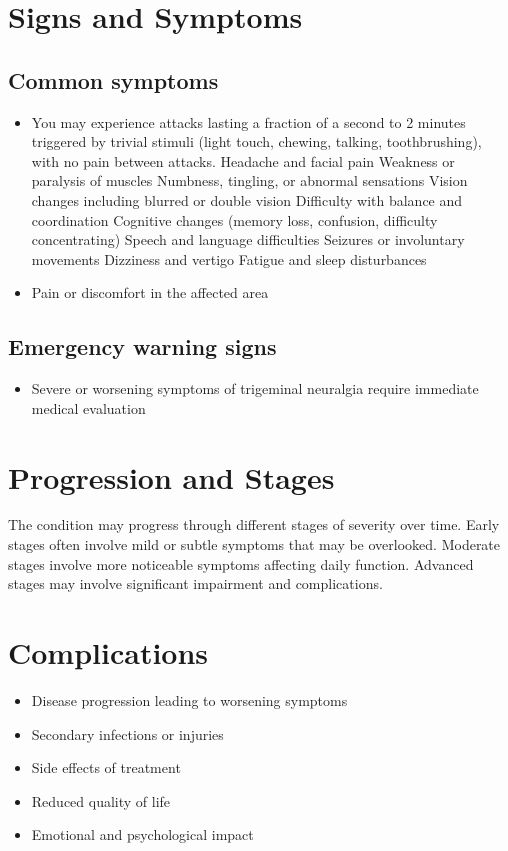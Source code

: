 \section{Signs and Symptoms}

\subsection{Common symptoms}
\begin{itemize}[noitemsep]
  \item You may experience attacks lasting a fraction of a second to 2 minutes triggered by trivial stimuli (light touch, chewing, talking, toothbrushing), with no pain between attacks. Headache and facial pain Weakness or paralysis of muscles Numbness, tingling, or abnormal sensations Vision changes including blurred or double vision Difficulty with balance and coordination Cognitive changes (memory loss, confusion, difficulty concentrating) Speech and language difficulties Seizures or involuntary movements Dizziness and vertigo Fatigue and sleep disturbances

  \item Pain or discomfort in the affected area
  \end{itemize}

\subsection{Emergency warning signs}
\begin{itemize}[noitemsep]
  \item Severe or worsening symptoms of trigeminal neuralgia require immediate medical evaluation
\end{itemize}
\section{Progression and Stages}
The condition may progress through different stages of severity over time. Early stages often involve mild or subtle symptoms that may be overlooked. Moderate stages involve more noticeable symptoms affecting daily function. Advanced stages may involve significant impairment and complications.
\section{Complications}
\begin{itemize}[noitemsep]
  \item Disease progression leading to worsening symptoms
  \item Secondary infections or injuries
  \item Side effects of treatment
  \item Reduced quality of life
  \item Emotional and psychological impact
\end{itemize}
